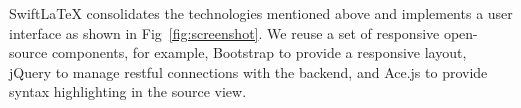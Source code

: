 \documentclass[sigconf]{acmart}
\newcommand{\todo}[1]{\textbf{\{TODO: #1\}}}
\begin{document}
SwiftLaTeX consolidates the technologies mentioned above and implements a user interface as shown in Fig~\ref{fig:screenshot}.
We reuse a set of responsive open-source components, for example, Bootstrap \cite{spurlock2013bootstrap} to provide a responsive layout, jQuery \cite{bibeault2008jquery} to manage restful connections with the backend, and Ace.js \cite{acejs} to provide syntax highlighting in the source view.










\end{document}
